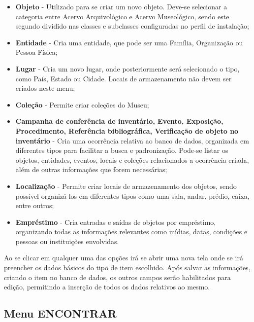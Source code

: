 \documentclass[a4paper,12pt,oneside,onecolumn,final,fleqn]{repUERJ}
\begin{document}
\begin{itemize}
	\item \textbf{Objeto} - Utilizado para se criar um novo objeto. Deve-se selecionar a categoria entre Acervo Arquivológico e Acervo Museológico, sendo este segundo dividido nas classes e subclasses configuradas no perfil de instalação;
	\item \textbf{Entidade} - Cria uma entidade, que pode ser uma Família, Organização ou Pessoa Física;
	\item \textbf{Lugar} - Cria um novo lugar, onde posteriormente será selecionado o tipo, como País, Estado ou Cidade. Locais de armazenamento não devem ser criados neste menu;
	\item \textbf{Coleção} - Permite criar coleções do Museu;
	\item \textbf{Campanha de conferência de inventário, Evento, Exposição, Procedimento, Referência bibliográfica, Verificação de objeto no inventário} - Cria uma ocorrência relativa ao banco de dados, organizada em diferentes tipos para facilitar a busca e padronização. Pode-se listar os objetos, entidades, eventos, locais e coleções relacionados a ocorrência criada, além de outras informações que forem necessárias;
	\item \textbf{Localização} - Permite criar locais de armazenamento dos objetos, sendo possível organizá-los em diferentes tipos como uma sala, andar, prédio, caixa, entre outros;
	\item \textbf{Empréstimo} - Cria entradas e saídas de objetos por empréstimo, organizando todas as informações relevantes como mídias, datas, condições e pessoas ou instituições envolvidas.
\end{itemize}

Ao se clicar em qualquer uma das opções irá se abrir uma nova tela onde se irá preencher os dados básicos do tipo de item escolhido. Após salvar as informações, criando o item no banco de dados, os outros campos serão habilitados para edição, permitindo a inserção de todos os dados relativos ao mesmo.

\subsection{Menu ENCONTRAR}
\end{document}
